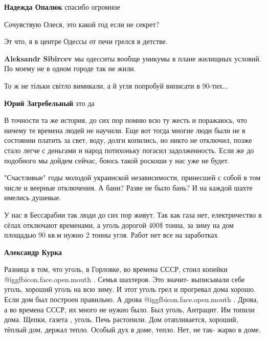 \begin{itemize}
\begin{itemize}
\textbf{Надежда Опалюк} спасибо огромное

Сочувствую Олеся, это какой год если не секрет?
\end{itemize} %

Эт что, я в центре Одессы от печи грелся в детстве.

\textbf{Aleksandr Sibircev} мы одесситы вообще уникумы в плане жилищных условий. По моему не в одном городе так не жили.

То ж не тільки світло вимикали, а й угля попробуй виписати в 90-тих...

\textbf{Юрий Загребельный} это да


В точности та же история, до сих пор помню всю ту жесть и поражаюсь, что ничему
те времена людей не научили. Еще вот тогда многие люди были не в состоянии
платить за свет, воду, долги копились, но никто не отключил, позже стало легче
с деньгами и народ потихоньку погасил задолженность. Если же до подобного мы
дойдем сейчас, боюсь такой роскоши у нас уже не будет.



"Счастливые" годы молодой украинской независимости, принесшей с собой в том
числе и веерные отключения. А бани? Разве не было бань? И на каждой шахте
имелись душевые.



У нас в Бессарабии так люди до сих пор живут. Так как газа нет, електричество в
сёлах отключают временами, а уголь дорогой 400\$ тонна, за зиму на дом площадью
90 кв.м нужно 2 тонны угля. Работ нет все на заработках

\begin{itemize} %
\textbf{Александр Курка} 

Разница в том, что уголь, в Горловке, во времена СССР, стоил копейки
@igg{fbicon.face.open.mouth} . Семья шахтеров. Это значит- выписывали себе
уголь, хороший уголь на всю зиму. И этот уголь грел и прогревал дома хорошо.
Если дом был построен правильно. А дрова @igg{fbicon.face.open.mouth} . Дрова,
а во времена СССР, их много не нужно было. Был уголь, Антрацит. Им топили дома.
Щепки, газета , уголь. Печь растопили. Дом отапливается, хороший, тёплый дом,
держал тепло. Особый дух в доме, тепло. Нет, не так- жарко в доме.


\end{itemize}
\end{itemize}
